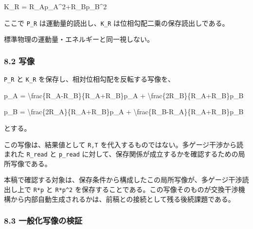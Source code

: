 \documentclass[
  a4paper,
]{article}
\newenvironment{Shaded}{}{}
\newcommand{\NormalTok}[1]{#1}
\begin{document}
\begin{Shaded}
\begin{Highlighting}[]
\NormalTok{K\_R}
\NormalTok{=}
\NormalTok{R\_Ap\_A\^{}2+R\_Bp\_B\^{}2}
\end{Highlighting}
\end{Shaded}

ここで \texttt{P\_R} は運動量的読出し、\texttt{K\_R}
は位相勾配二乗の保存読出しである。

標準物理の運動量・エネルギーと同一視しない。

\subsubsection{8.2 写像}\label{ux5199ux50cf}

\texttt{P\_R} と \texttt{K\_R} を保存し、相対位相勾配を反転する写像を、

\begin{Shaded}
\begin{Highlighting}[]
\NormalTok{p\_A\textquotesingle{}}
\NormalTok{=}
\NormalTok{\textbackslash{}frac\{R\_A{-}R\_B\}\{R\_A+R\_B\}p\_A}
\NormalTok{+}
\NormalTok{\textbackslash{}frac\{2R\_B\}\{R\_A+R\_B\}p\_B}
\end{Highlighting}
\end{Shaded}

\begin{Shaded}
\begin{Highlighting}[]
\NormalTok{p\_B\textquotesingle{}}
\NormalTok{=}
\NormalTok{\textbackslash{}frac\{2R\_A\}\{R\_A+R\_B\}p\_A}
\NormalTok{+}
\NormalTok{\textbackslash{}frac\{R\_B{-}R\_A\}\{R\_A+R\_B\}p\_B}
\end{Highlighting}
\end{Shaded}

とする。

この写像は、結果値として \texttt{R,T}
を代入するものではない。多ゲージ干渉から読まれた \texttt{R\_read} と
\texttt{p\_read}
に対して、保存関係が成立するかを確認するための局所写像である。

本稿で確認する対象は、保存条件から構成したこの局所写像が、多ゲージ干渉読出し上で
\texttt{R*p} と \texttt{R*p\^{}2}
を保存することである。この写像そのものが交換干渉機構から内部自動生成されるかは、前稿との接続として残る後続課題である。

\subsubsection{8.3
一般化写像の検証}\label{ux4e00ux822cux5316ux5199ux50cfux306eux691cux8a3c}
\end{document}
